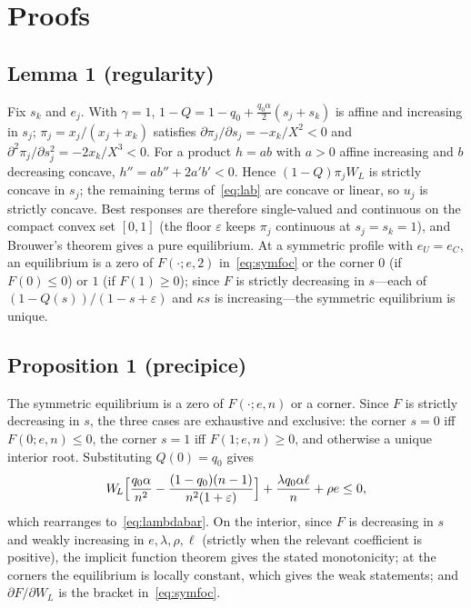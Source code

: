 \documentclass[11pt]{article}
\theoremstyle{plain}
\theoremstyle{definition}
\theoremstyle{remark}
\newcommand{\WL}{W_{\!L}}
\begin{document}
\appendix
\section{Proofs}

\subsection{Lemma 1 (regularity)}
Fix $s_k$ and $e_j$. With $\gamma=1$, $1-Q=1-q_0+\tfrac{q_0\alpha}{2}(s_j+s_k)$ is affine and increasing in $s_j$; $\pi_j=x_j/(x_j+x_k)$ satisfies $\partial\pi_j/\partial s_j=-x_k/X^2<0$ and $\partial^2\pi_j/\partial s_j^2=-2x_k/X^3<0$. For a product $h=ab$ with $a>0$ affine increasing and $b$ decreasing concave, $h''=ab''+2a'b'<0$. Hence $(1-Q)\pi_j\WL$ is strictly concave in $s_j$; the remaining terms of~\eqref{eq:lab} are concave or linear, so $u_j$ is strictly concave. Best responses are therefore single-valued and continuous on the compact convex set $[0,1]$ (the floor $\varepsilon$ keeps $\pi_j$ continuous at $s_j=s_k=1$), and Brouwer's theorem gives a pure equilibrium. At a symmetric profile with $e_U=e_C$, an equilibrium is a zero of $F(\cdot;e,2)$ in~\eqref{eq:symfoc} or the corner $0$ (if $F(0)\le0$) or $1$ (if $F(1)\ge0$); since $F$ is strictly decreasing in $s$---each of $(1-Q(s))/(1-s+\varepsilon)$ and $\kappa s$ is increasing---the symmetric equilibrium is unique.

\subsection{Proposition 1 (precipice)}
The symmetric equilibrium is a zero of $F(\cdot;e,n)$ or a corner. Since $F$ is strictly decreasing in $s$, the three cases are exhaustive and exclusive: the corner $s=0$ iff $F(0;e,n)\le0$, the corner $s=1$ iff $F(1;e,n)\ge0$, and otherwise a unique interior root. Substituting $Q(0)=q_0$ gives
\[
\WL\Bigl[\frac{q_0\alpha}{n^2}-\frac{(1-q_0)(n-1)}{n^2(1+\varepsilon)}\Bigr]+\frac{\lambda q_0\alpha\ell}{n}+\rho e\le0,
\]
which rearranges to~\eqref{eq:lambdabar}. On the interior, since $F$ is decreasing in $s$ and weakly increasing in $e,\lambda,\rho,\ell$ (strictly when the relevant coefficient is positive), the implicit function theorem gives the stated monotonicity; at the corners the equilibrium is locally constant, which gives the weak statements; and $\partial F/\partial\WL$ is the bracket in~\eqref{eq:symfoc}.
\end{document}
